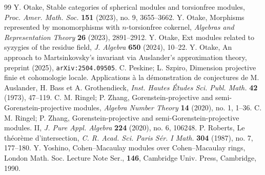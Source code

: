 \documentclass{amsart}
\theoremstyle{definition}
\theoremstyle{remark}
\numberwithin{equation}{thm}
\begin{document}
\begin{thebibliography}{99}
{\sc Y. Otake}, Stable categories of spherical modules and torsionfree modules, {\em Proc. Amer. Math. Soc.} {\bf 151} (2023), no. 9, 3655--3662.
{\sc Y. Otake}, Morphisms represented by monomorphisms with $n$-torsionfree cokernel, {\em Algebras and Representation Theory} {\bf 26} (2023), 2891--2912.
{\sc Y. Otake}, Ext modules related to syzygies of the residue field, {\em J. Algebra} {\bf 650} (2024), 10--22.
{\sc Y. Otake}, An approach to Martsinkovsky's invariant via Auslander's approximation theory, preprint (2025), {\tt arXiv:2504.09505}.
{\sc C. Peskine; L. Szpiro}, Dimension projective finie et cohomologie locale. Applications \`a la d\'emonstration de conjectures de M. Auslander, H. Bass et A. Grothendieck, {\em Inst. Hautes \'Etudes Sci. Publ. Math.} {\bf 42} (1973), 47--119.
{\sc C. M. Ringel; P. Zhang}, Gorenstein-projective and semi-Gorenstein-projective modules, {\em Algebra Number Theory} {\bf 14} (2020), no. 1, 1--36.
{\sc C. M. Ringel; P. Zhang}, Gorenstein-projective and semi-Gorenstein-projective modules. II, {\em J. Pure Appl. Algebra} {\bf 224} (2020), no. 6, 106248.
{\sc P. Roberts}, Le th\'eor\`eme d'intersection, {\em C. R. Acad. Sci. Paris S\'er. I Math.} {\bf 304} (1987), no. 7, 177--180.
{\sc Y. Yoshino}, Cohen--Macaulay modules over Cohen--Macaulay rings, London Math. Soc. Lecture Note Ser., {\bf 146}, Cambridge Univ. Press, Cambridge, 1990.
\end{thebibliography}
\end{document}
